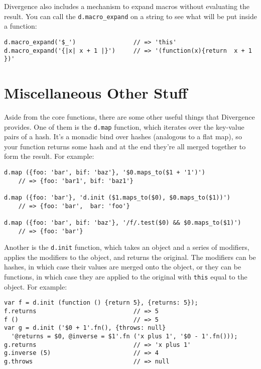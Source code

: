 \documentclass{report}
\begin{document}
    Divergence also includes a mechanism to expand macros without evaluating the result. You can call the \verb|d.macro_expand| on a string to see what will be put inside a function:

\begin{verbatim}
d.macro_expand('$_')                // => 'this'
d.macro_expand('{|x| x + 1 |}')     // => '(function(x){return  x + 1 })'
\end{verbatim}

\chapter {Miscellaneous Other Stuff}
    \label{sec:miscellaneous-other-stuff}
    Aside from the core functions, there are some other useful things that Divergence provides. One of them is the \verb|d.map| function, which iterates over the key-value pairs of a hash.
    It's a monadic bind over hashes (analogous to a flat map), so your function returns some hash and at the end they're all merged together to form the result. For example:

\begin{verbatim}
d.map ({foo: 'bar', bif: 'baz'}, '$0.maps_to($1 + '1')')
    // => {foo: 'bar1', bif: 'baz1'}

d.map ({foo: 'bar'}, 'd.init ($1.maps_to($0), $0.maps_to($1))')
    // => {foo: 'bar',  bar: 'foo'}

d.map ({foo: 'bar', bif: 'baz'}, '/f/.test($0) && $0.maps_to($1)')
    // => {foo: 'bar'}
\end{verbatim}

    Another is the \verb|d.init| function, which takes an object and a series of modifiers, applies the modifiers to the object, and returns the original. The modifiers can be hashes, in which
    case their values are merged onto the object, or they can be functions, in which case they are applied to the original with \verb|this| equal to the object. For example:

\begin{verbatim}
var f = d.init (function () {return 5}, {returns: 5});
f.returns                           // => 5
f ()                                // => 5
var g = d.init ('$0 + 1'.fn(), {throws: null}
  '@returns = $0, @inverse = $1'.fn ('x plus 1', '$0 - 1'.fn()));
g.returns                           // => 'x plus 1'
g.inverse (5)                       // => 4
g.throws                            // => null
\end{verbatim}
\end{document}
